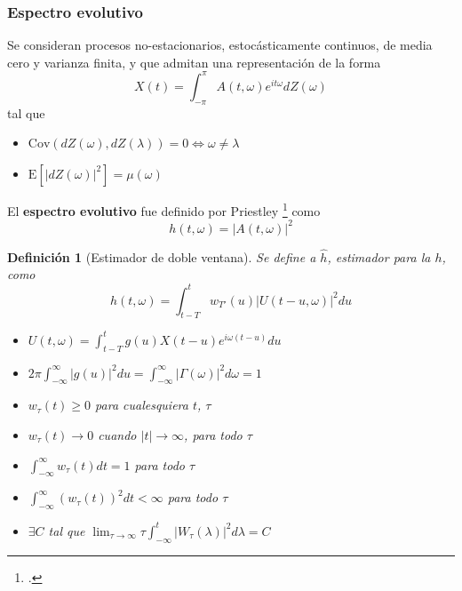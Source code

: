\documentclass[serif,mathserif,professionalfont]{beamer}
\newtheorem{definicion}{Definición}
\newcommand{\intPI}{\int_{-\pi}^{\pi}}
\newcommand{\est}[1]{\widehat{ #1 }}
\newcommand{\E}[1]{\mathrm{E}\left[ #1 \right]}
\newcommand{\Cov}[1]{\mathrm{Cov}\left( #1 \right)}
\newcommand{\abso}[1]{\left| #1 \right|}
\begin{document}
\begin{frame}\frametitle{Espectro evolutivo}
Se consideran procesos no-estacionarios, estoc\'asticamente continuos, de media cero y varianza 
finita, y que admitan una representaci\'on de la forma
\begin{equation*}
X(t) = \intPI A(t,\omega) e^{i t \omega} dZ(\omega)
\end{equation*}
tal que 
\begin{itemize}
\item $\Cov{dZ(\omega),dZ(\lambda)} = 0 \Leftrightarrow \omega \neq \lambda$
\item $\E{\abso{dZ(\omega)}^{2}} = \mu(\omega)$
\end{itemize}

El \textbf{espectro evolutivo} fue definido por Priestley \footcite{Priestley65} como
\begin{equation*}
h(t,\omega) = \abso{A(t,\omega)}^{2}
\end{equation*}
\end{frame}


\begin{frame}%
\begin{definicion}[Estimador de doble ventana]
Se define a $\est{h}$, estimador para la $h$, como
\begin{equation*}
\widehat{h}(t,\omega) = \int_{t-T}^{t} w_{T'}(u) \lvert U(t-u,\omega) \lvert^{2} du
\end{equation*}

\begin{itemize}
\item $U(t,\omega) = \int_{t-T}^{t} g(u) X({t-u}) e^{i \omega (t-u)} du$

\item $2\pi \int_{-\infty}^{\infty} \lvert g(u) \lvert^{2} du = 
\int_{-\infty}^{\infty} \lvert \Gamma(\omega) \lvert^{2} d\omega = 1$
\item $w_{\tau}(t) \geq 0$ para cualesquiera $t$, $\tau$
\item $w_{\tau}(t) \rightarrow 0$ cuando $\lvert t \lvert \rightarrow \infty$, para todo $\tau$
\item $\int_{-\infty}^{\infty} w_{\tau}(t) dt = 1$ para todo $\tau$
\item $ \int_{-\infty}^{\infty} \left( w_{\tau}(t) \right)^{2} dt < \infty$ para todo $\tau$
\item $\exists C$ tal que  
$ \lim_{\tau\rightarrow\infty} \tau \int_{-\infty}^{t} \abso{ W_{\tau}(\lambda) }^{2} d\lambda = C$
\end{itemize}
\end{definicion}
\end{frame}
\end{document}
